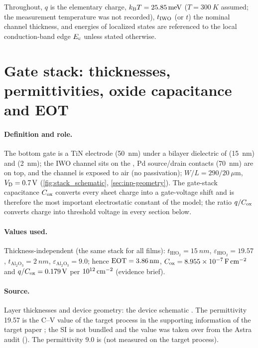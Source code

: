 Throughout, $q$ is the elementary charge, $k_{\mathrm{B}}T = \SI{25.85}{meV}$ ($T = \SI{300}{K}$ assumed; the
measurement temperature was not recorded), $t_{\mathrm{IWO}}$ (or $t$) the nominal channel thickness, and energies of
localized states are referenced to the local conduction-band edge $E_{\mathrm{c}}$ unless stated otherwise.

\section{Gate stack: thicknesses, permittivities, oxide capacitance and EOT}
\label{sec:par-stack}

\paragraph{Definition and role.}
The bottom gate is a TiN electrode (\SI{50}{nm}) under a bilayer dielectric of \HfO{} (\SI{15}{nm}) and
\AlO{} (\SI{2}{nm}); the IWO channel sits on the \AlO{}, Pd source/drain contacts (\SI{70}{nm}) are on top,
and the channel is exposed to air (no passivation); $W/L = 290/20~\mu$m, $V_{\mathrm{D}} = \SI{0.7}{V}$
(\cref{fig:stack_schematic}, \cref{sec:inp-geometry}). The gate-stack capacitance $C_{\mathrm{ox}}$ converts every sheet
charge into a gate-voltage shift and is therefore the most important electrostatic constant of the
model; the ratio $q/C_{\mathrm{ox}}$ converts charge into threshold voltage in every section below.

\paragraph{Values used.}
Thickness-independent (the same stack for all films): $t_{\mathrm{HfO_2}} = \SI{15}{nm}$,
$\varepsilon_{\mathrm{HfO_2}} = 19.57$, $t_{\mathrm{Al_2O_3}} = \SI{2}{nm}$,
$\varepsilon_{\mathrm{Al_2O_3}} = 9.0$; hence $\mathrm{EOT} = \SI{3.86}{nm}$,
$C_{\mathrm{ox}} = \SI{8.955e-7}{\farad\per\centi\metre\squared}$ and $q/C_{\mathrm{ox}} = \SI{0.179}{V}$ per
$10^{12}\,\mathrm{cm}^{-2}$ (evidence brief).

\paragraph{Source.}
Layer thicknesses and device geometry: the device schematic \citep{DeviceSchematic}. The \HfO{}
permittivity 19.57 is the C--V value of the target process in the supporting information of the target
paper \citep[SI Fig.~S1b]{JanuarSI2026}; the SI is not bundled and the value was taken over from the Astra
audit (). The \AlO{} permittivity 9.0 is  (not measured on the
target process).

